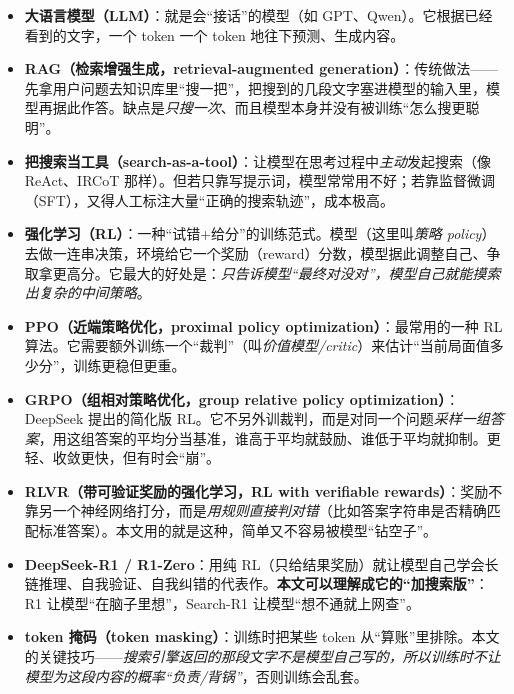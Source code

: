 \documentclass[11pt,UTF8,fontset=fandol]{ctexart}
\begin{document}
\begin{itemize}[leftmargin=1.4em]
\item \textbf{大语言模型（LLM）}：就是会“接话”的模型（如 GPT、Qwen）。它根据已经看到的文字，一个 token 一个 token 地往下预测、生成内容。

\item \textbf{RAG（检索增强生成，retrieval-augmented generation）}：传统做法——先拿用户问题去知识库里“搜一把”，把搜到的几段文字塞进模型的输入里，模型再据此作答。缺点是\emph{只搜一次}、而且模型本身并没有被训练“怎么搜更聪明”。

\item \textbf{把搜索当工具（search-as-a-tool）}：让模型在思考过程中\emph{主动}发起搜索（像 ReAct、IRCoT 那样）。但若只靠写提示词，模型常常用不好；若靠监督微调（SFT），又得人工标注大量“正确的搜索轨迹”，成本极高。

\item \textbf{强化学习（RL）}：一种“试错+给分”的训练范式。模型（这里叫\emph{策略 policy}）去做一连串决策，环境给它一个奖励（reward）分数，模型据此调整自己、争取拿更高分。它最大的好处是：\emph{只告诉模型“最终对没对”，模型自己就能摸索出复杂的中间策略}。

\item \textbf{PPO（近端策略优化，proximal policy optimization）}：最常用的一种 RL 算法。它需要额外训练一个“裁判”（叫\emph{价值模型/critic}）来估计“当前局面值多少分”，训练更稳但更重。

\item \textbf{GRPO（组相对策略优化，group relative policy optimization）}：DeepSeek 提出的简化版 RL。它不另外训裁判，而是对同一个问题\emph{采样一组答案}，用这组答案的平均分当基准，谁高于平均就鼓励、谁低于平均就抑制。更轻、收敛更快，但有时会“崩”。

\item \textbf{RLVR（带可验证奖励的强化学习，RL with verifiable rewards）}：奖励不靠另一个神经网络打分，而是\emph{用规则直接判对错}（比如答案字符串是否精确匹配标准答案）。本文用的就是这种，简单又不容易被模型“钻空子”。

\item \textbf{DeepSeek-R1 / R1-Zero}：用纯 RL（只给结果奖励）就让模型自己学会长链推理、自我验证、自我纠错的代表作。\textbf{本文可以理解成它的“加搜索版”}：R1 让模型“在脑子里想”，Search-R1 让模型“想不通就上网查”。

\item \textbf{token 掩码（token masking）}：训练时把某些 token 从“算账”里排除。本文的关键技巧——\emph{搜索引擎返回的那段文字不是模型自己写的，所以训练时不让模型为这段内容的概率“负责/背锅”}，否则训练会乱套。
\end{itemize}
\end{document}
